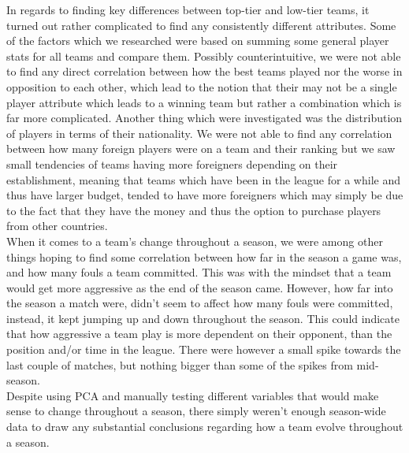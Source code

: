 \documentclass[Report.tex]{subfiles}
\begin{document}
In regards to finding key differences between top-tier and low-tier teams, it turned out rather complicated to find any consistently different attributes. Some of the factors which we researched were based on summing some general player stats for all teams and compare them. Possibly counterintuitive, we were not able to find any direct correlation between how the best teams played nor the worse in opposition to each other, which lead to the notion that their may not be a single player attribute which leads to a winning team but rather a combination which is far more complicated. Another thing which were investigated was the distribution of players in terms of their nationality. We were not able to find any correlation between how many foreign players were on a team and their ranking but we saw small tendencies of teams having more foreigners depending on their establishment, meaning that teams which have been in the league for a while and thus have larger budget, tended to have more foreigners which may simply be due to the fact that they have the money and thus the option to purchase players from other countries. \\
When it comes to a team's change throughout a season, we were among other things hoping to find some correlation between how far in the season a game was, and how many fouls a team committed. This was with the mindset that a team would get more aggressive as the end of the season came. However, how far into the season a match were, didn't seem to affect how many fouls were committed, instead, it kept jumping up and down throughout the season. This could indicate that how aggressive a team play is more dependent on their opponent, than the position and/or time in the league. There were however a small spike towards the last couple of matches, but nothing bigger than some of the spikes from mid-season.\\
Despite using PCA and manually testing different variables that would make sense to change throughout a season, there simply weren't enough season-wide data to draw any substantial conclusions regarding how a team evolve throughout a season.

	
\end{document}
